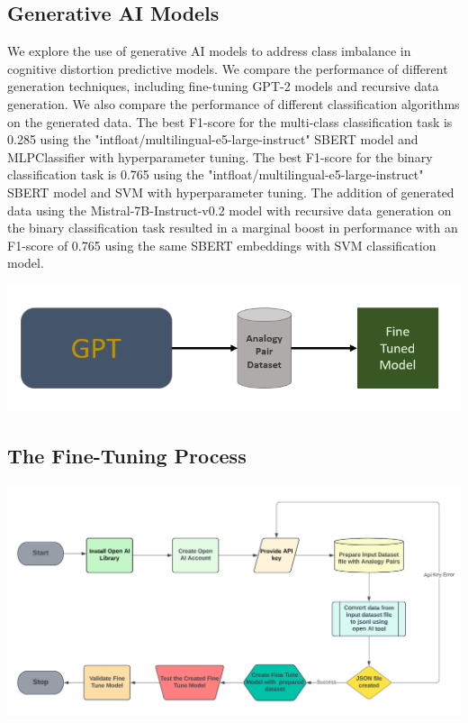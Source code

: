 \documentclass[a0,landscape]{a0poster}
\begin{document}
\begin{multicols}{4}
\color{Black}

\color{Teal}
\section*{Generative AI Models}
\color{Black}

We explore the use of generative AI models to address class imbalance in cognitive distortion predictive models. We compare the performance of different generation 
techniques, including fine-tuning GPT-2 models and recursive data generation. We also compare the performance of different classification algorithms on the generated data. 
The best F1-score for the multi-class classification task is 0.285 using the "intfloat/multilingual-e5-large-instruct" SBERT model and MLPClassifier with hyperparameter 
tuning. The best F1-score for the binary classification task is 0.765 using the "intfloat/multilingual-e5-large-instruct" SBERT model and SVM with hyperparameter tuning. 
The addition of generated data using the Mistral-7B-Instruct-v0.2 model with recursive data generation on the binary classification task resulted in a marginal boost 
in performance with an F1-score of 0.765 using the same SBERT embeddings with SVM classification model.

\begin{center}
\includegraphics[width=0.60\linewidth]{Fine-Tune-GPT.png}
\end{center}\vspace{1cm}

\color{Teal}
\subsection*{The Fine-Tuning Process}
\begin{center}
\includegraphics[width=0.99\linewidth]{FlowChart.png}
\end{center}\vspace{1cm}


\end{multicols}
\end{document}
